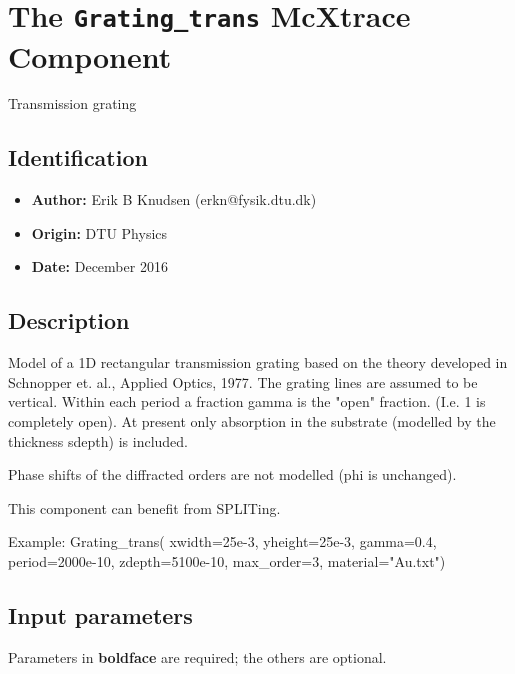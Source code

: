 \section{The \texttt{Grating\_trans} McXtrace Component}
Transmission grating

\subsection*{Identification}
\begin{itemize}
  \item \textbf{Author:} Erik B Knudsen (erkn@fysik.dtu.dk)
  \item \textbf{Origin:} DTU Physics
  \item \textbf{Date:} December 2016
\end{itemize}

\subsection*{Description}
Model of a 1D rectangular transmission grating based on the theory developed in Schnopper et. al., Applied Optics, 1977. The grating lines are assumed to be vertical. Within each period a fraction gamma is the "open" fraction. (I.e. 1 is completely open). At present only absorption in the substrate (modelled by the thickness sdepth) is included.

Phase shifts of the diffracted orders are not modelled (phi is unchanged).

This component can benefit from SPLITing.

Example: Grating\_trans( xwidth=25e-3, yheight=25e-3, gamma=0.4, period=2000e-10, zdepth=5100e-10, max\_order=3, material="Au.txt")

\subsection*{Input parameters}
Parameters in \textbf{boldface} are required; the others are optional.

